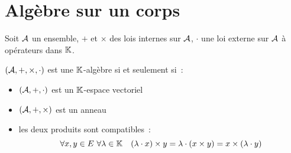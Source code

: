 \section{Algèbre sur un corps}
Soit $\mathcal{A}$ un ensemble, $+$ et $\times$ des lois internes sur $\mathcal{A}$, $\cdot$ une loi externe sur $\mathcal{A}$ à opérateurs dans $\mathbb{K}$.
\begin{defdef}[Algèbre]
	$(\mathcal{A},+,\times,\cdot)$ est une $\mathbb{K}$-algèbre si et seulement si~:
	\begin{itemize}
		\item $(\mathcal{A},+,\cdot)$ est un $\mathbb{K}$-espace vectoriel
		\item $(\mathcal{A},+,\times)$ est un anneau
		\item les deux produits sont compatibles~:
		\begin{equation}
			\forall x,y \in E \ \forall \lambda \in \mathbb{K} \quad (\lambda \cdot x) \times y = \lambda \cdot (x \times y) = x \times (\lambda \cdot y)
		\end{equation}
	\end{itemize}
\end{defdef}

